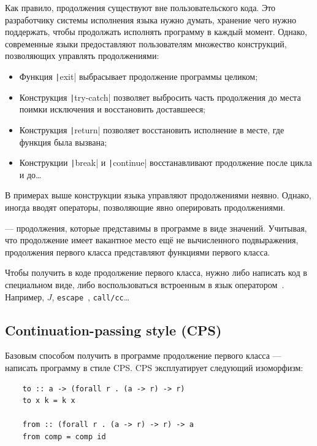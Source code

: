 Как правило, продолжения существуют вне пользовательского кода.
Это разработчику системы исполнения языка нужно думать, хранение чего нужно поддержать, чтобы продолжать исполнять программу в каждый момент.
Однако, современные языки предоставляют пользователям множество конструкций, позволяющих управлять продолжениями:

\begin{itemize}
    \item Функция \texttt|exit| выбрасывает продолжение программы целиком;
    \item Конструкция \texttt|try-catch| позволяет выбросить часть продолжения до места поимки исключения и восстановить доставшееся;
    \item Конструкция \texttt|return| позволяет восстановить исполнение в месте, где функция была вызвана;
    \item Конструкции \texttt|break| и \texttt|continue| восстанавливают продолжение после цикла и до\ldots
\end{itemize}

В примерах выше конструкции языка управляют продолжениями неявно.
Однако, иногда вводят операторы, позволяющие явно оперировать продолжениями.

 --- продолжения, которые представимы в программе в виде значений.
Учитывая, что продолжение имеет вакантное место ещё не вычисленного подвыражения, продолжения первого класса представляют функциями первого класса.

Чтобы получить в коде продолжение первого класса, нужно либо написать код в специальном виде, либо воспользоваться встроенным в язык оператором~\cite[приложение A]{hillerstrom2022foundations}.
Например, $J$, \texttt{escape}~\cite{reynolds1972definitional}, \texttt{call/cc}\ldots

\subsection{Continuation-passing style (CPS)}

Базовым способом получить в программе продолжение первого класса --- написать программу в стиле CPS.
CPS эксплуатирует следующий изоморфизм:
\begin{verbatim}
    to :: a -> (forall r . (a -> r) -> r)
    to x k = k x

    from :: (forall r . (a -> r) -> r) -> a
    from comp = comp id
\end{verbatim}

